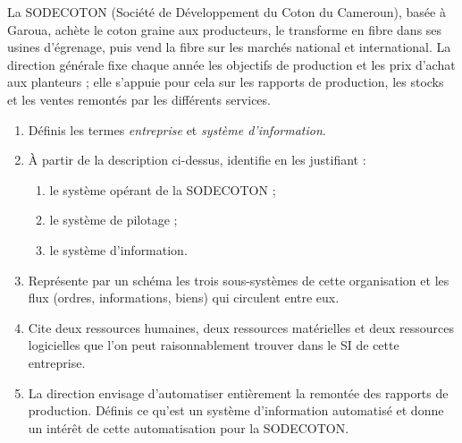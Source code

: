 \documentclass[11pt]{article}
\begin{document}
\begin{exercice}
La SODECOTON (Société de Développement du Coton du Cameroun), basée à Garoua, achète le coton graine aux producteurs, le transforme en fibre dans ses usines d'égrenage, puis vend la fibre sur les marchés national et international. La direction générale fixe chaque année les objectifs de production et les prix d'achat aux planteurs ; elle s'appuie pour cela sur les rapports de production, les stocks et les ventes remontés par les différents services.
\begin{enumerate}
\item Définis les termes \emph{entreprise} et \emph{système d'information}.
\item À partir de la description ci-dessus, identifie en les justifiant :
\begin{enumerate}
\item le système opérant de la SODECOTON ;
\item le système de pilotage ;
\item le système d'information.
\end{enumerate}
\item Représente par un schéma les trois sous-systèmes de cette organisation et les flux (ordres, informations, biens) qui circulent entre eux.
\item Cite deux ressources humaines, deux ressources matérielles et deux ressources logicielles que l'on peut raisonnablement trouver dans le SI de cette entreprise.
\item La direction envisage d'automatiser entièrement la remontée des rapports de production. Définis ce qu'est un système d'information automatisé et donne un intérêt de cette automatisation pour la SODECOTON.
\end{enumerate}
\end{exercice}
\end{document}
